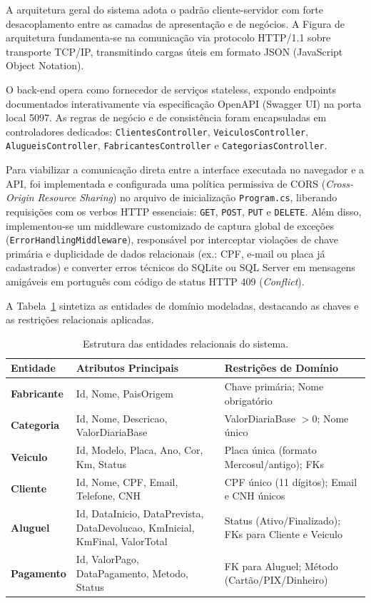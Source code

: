 \documentclass[12pt]{article}
\begin{document}
A arquitetura geral do sistema adota o padrão cliente-servidor com forte desacoplamento entre as camadas de apresentação e de negócios. A Figura de arquitetura fundamenta-se na comunicação via protocolo HTTP/1.1 sobre transporte TCP/IP, transmitindo cargas úteis em formato JSON (JavaScript Object Notation).

O back-end opera como fornecedor de serviços stateless, expondo endpoints documentados interativamente via especificação OpenAPI (Swagger UI) na porta local 5097. As regras de negócio e de consistência foram encapsuladas em controladores dedicados: \texttt{ClientesController}, \texttt{VeiculosController}, \texttt{AlugueisController}, \texttt{FabricantesController} e \texttt{CategoriasController}.

Para viabilizar a comunicação direta entre a interface executada no navegador e a API, foi implementada e configurada uma política permissiva de CORS (\textit{Cross-Origin Resource Sharing}) no arquivo de inicialização \texttt{Program.cs}, liberando requisições com os verbos HTTP essenciais: \texttt{GET}, \texttt{POST}, \texttt{PUT} e \texttt{DELETE}. Além disso, implementou-se um middleware customizado de captura global de exceções (\texttt{ErrorHandlingMiddleware}), responsável por interceptar violações de chave primária e duplicidade de dados relacionais (ex.: CPF, e-mail ou placa já cadastrados) e converter erros técnicos do SQLite ou SQL Server em mensagens amigáveis em português com código de status HTTP 409 (\textit{Conflict}).

A Tabela~\ref{tab:entidades} sintetiza as entidades de domínio modeladas, destacando as chaves e as restrições relacionais aplicadas.

\begin{table}[H]
\centering
\caption{Estrutura das entidades relacionais do sistema.}
\label{tab:entidades}
\vspace{2mm}
\footnotesize
\begin{tabular}{lp{4.8cm}l}
\toprule
\textbf{Entidade} & \textbf{Atributos Principais} & \textbf{Restrições de Domínio} \\
\midrule
\textbf{Fabricante} & Id, Nome, PaisOrigem & Chave primária; Nome obrigatório \\
\textbf{Categoria} & Id, Nome, Descricao, ValorDiariaBase & ValorDiariaBase $> 0$; Nome único \\
\textbf{Veiculo} & Id, Modelo, Placa, Ano, Cor, Km, Status & Placa única (formato Mercosul/antigo); FKs \\
\textbf{Cliente} & Id, Nome, CPF, Email, Telefone, CNH & CPF único (11 dígitos); Email e CNH únicos \\
\textbf{Aluguel} & Id, DataInicio, DataPrevista, DataDevolucao, KmInicial, KmFinal, ValorTotal & Status (Ativo/Finalizado); FKs para Cliente e Veiculo \\
\textbf{Pagamento} & Id, ValorPago, DataPagamento, Metodo, Status & FK para Aluguel; Método (Cartão/PIX/Dinheiro) \\
\bottomrule
\end{tabular}
\end{table}
\end{document}
